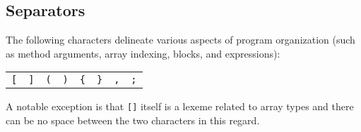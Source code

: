 \subsection{Separators}
The following characters delineate various aspects of program organization (such as method arguments, array indexing, blocks, and expressions):
\begin{center}
\begin{tabular}{cccccccc}
\verb![! & \verb|]| & \verb!(! & \verb!)! & \verb!{! & \verb!}! & \verb!,! & \verb!;!\\
\end{tabular}
\end{center}
A notable exception is that \verb![]! itself is a lexeme related to array types and there can be no space between the two characters in this regard.

